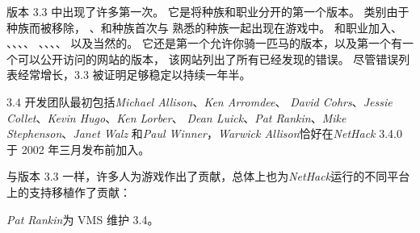\documentclass[a4paper, 10pt]{article}
\newcommand{\nd}{\noindent}
\begin{document}
\medskip
版本 3.3 中出现了许多第一次。
它是将种族和职业分开的第一个版本。
\zhTransElves{}类别由于\zhTransElves{}种族而被移除，
\zhTransDwarves、\zhTransGnomes{}和\zhTransOrcs{}种族首次与
熟悉的\zhTransHumans{}种族一起出现在游戏中。
\zhTransMonks{}和\zhTransRangers{}职业加入\zhTransArcheologists、
\zhTransBarbarians、\zhTransCavemen、\zhTransHealers、\zhTransKnights、
\zhTransPriests、\zhTransRogues、\zhTransSamurai、\zhTransTourists、
\zhTransValkyries{}以及当然的\zhTransWizards。
它还是第一个允许你骑一匹马的版本，以及第一个有一个可以公开访问的网站的版本，
该网站列出了所有已经发现的错误。
尽管错误列表经常增长，3.3 被证明足够稳定以持续一年半。

\medskip
3.4 开发团队最初包括{\it Michael Allison}、{\it Ken Arromdee}、
{\it David Cohrs}、{\it Jessie Collet}、{\it Kevin Hugo}、{\it Ken Lorber}、
{\it Dean Luick}、{\it Pat Rankin}、{\it Mike Stephenson}、{\it Janet Walz}
和{\it Paul Winner}，{\it  Warwick Allison}恰好在{\it NetHack} 3.4.0 于
2002 年三月发布前加入。

\medskip
与版本 3.3 一样，许多人为游戏作出了贡献，总体上也为{\it NetHack\/}运行的不同平台
上的支持移植作了贡献：

\medskip
{\it Pat Rankin}为 VMS 维护 3.4。
\end{document}
